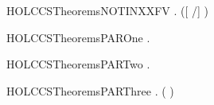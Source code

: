 \newcommand{\HOLCCSTheoremsNOTXXINXXDELETEXXELEMENT}{\UseVerbatim{HOLCCSTheoremsNOTXXINXXDELETEXXELEMENT}}
\begin{SaveVerbatim}{HOLCCSTheoremsNOTINXXFV}
\HOLTokenTurnstile{} \HOLSymConst{\HOLTokenForall{}}  .  \HOLConst{\HOLTokenNotIn{}}  ([  /] )
\end{SaveVerbatim}
\newcommand{\HOLCCSTheoremsNOTINXXFV}{\UseVerbatim{HOLCCSTheoremsNOTINXXFV}}
\begin{SaveVerbatim}{HOLCCSTheoremsPAROne}
\HOLTokenTurnstile{} \HOLSymConst{\HOLTokenForall{}}   .  \HOLTokenTransBegin{}\HOLTokenTransEnd {} \HOLSymConst{\HOLTokenImp{}}  \HOLSymConst{\ensuremath{\parallel}}  \HOLTokenTransBegin{}\HOLTokenTransEnd {} \HOLSymConst{\ensuremath{\parallel}} 
\end{SaveVerbatim}
\newcommand{\HOLCCSTheoremsPAROne}{\UseVerbatim{HOLCCSTheoremsPAROne}}
\begin{SaveVerbatim}{HOLCCSTheoremsPARTwo}
\HOLTokenTurnstile{} \HOLSymConst{\HOLTokenForall{}}   .  \HOLTokenTransBegin{}\HOLTokenTransEnd {} \HOLSymConst{\HOLTokenImp{}}  \HOLSymConst{\ensuremath{\parallel}}  \HOLTokenTransBegin{}\HOLTokenTransEnd {} \HOLSymConst{\ensuremath{\parallel}} 
\end{SaveVerbatim}
\newcommand{\HOLCCSTheoremsPARTwo}{\UseVerbatim{HOLCCSTheoremsPARTwo}}
\begin{SaveVerbatim}{HOLCCSTheoremsPARThree}
\HOLTokenTurnstile{} \HOLSymConst{\HOLTokenForall{}}    .
        \HOLTokenTransBegin{} \HOLTokenTransEnd {} \HOLSymConst{\HOLTokenConj{}}  \HOLTokenTransBegin{} ( )\HOLTokenTransEnd {} \HOLSymConst{\HOLTokenImp{}}
        \HOLSymConst{\ensuremath{\parallel}}  \HOLTokenTransBegin\HOLConst{\ensuremath{\tau}}\HOLTokenTransEnd {} \HOLSymConst{\ensuremath{\parallel}} 
\end{SaveVerbatim}
